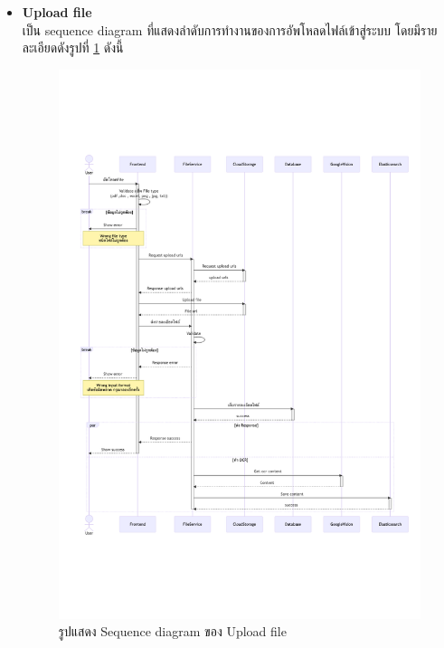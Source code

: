 \documentclass[12pt,oneside,openright,a4paper]{cpe-thai-project}
\begin{document}
\begin{itemize}
    \newpage
    \item \textbf{Upload file} \\
    เป็น sequence diagram ที่แสดงลำดับการทำงานของการอัพโหลดไฟล์เข้าสู่ระบบ โดยมีรายละเอียดดังรูปที่ \ref{fig:sqUploadFile} ดังนี้
    \begin{figure}[!ht]\centering
        \includegraphics[width=15cm, trim={1cm 6cm 0.5cm 6cm},clip]{./assets/sequence-diagram/upload-file.png}
        \caption{รูปแสดง Sequence diagram ของ Upload file}\label{fig:sqUploadFile}
    \end{figure}



\end{itemize}
\end{document}
